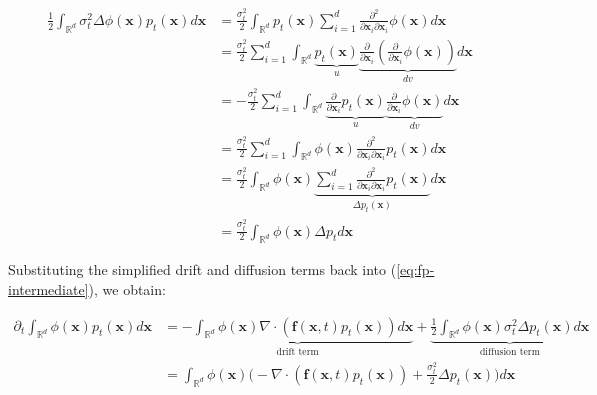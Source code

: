 \documentclass{article}
\begin{document}
\begin{small}
\begin{align}
    \frac{1}{2}\int_{\mathbb{R}^d}\sigma_t^2\Delta \phi(\boldsymbol{x})p_t(\boldsymbol{x})d\boldsymbol{x}&=\frac{\sigma_t^2}{2}\int_{\mathbb{R}^d}p_t(\boldsymbol{x})\sum_{i=1}^d\frac{\partial^2}{\partial\boldsymbol{x}_i \partial\boldsymbol{x}_i} \phi(\boldsymbol{x})d\boldsymbol{x}\nonumber\\
    &=\frac{\sigma_t^2}{2}\sum_{i=1}^d\int_{\mathbb{R}^d}\underbrace{p_t(\boldsymbol{x})}_{u}\underbrace{\frac{\partial}{\partial\boldsymbol{x}_i}\left( \frac{\partial}{\partial\boldsymbol{x}_i}\phi(\boldsymbol{x})\right)}_{dv}d\boldsymbol{x}\tag{1st integration by parts}\\
    &= -\frac{\sigma_t^2}{2}\sum_{i=1}^d\int_{\mathbb{R}^d}\underbrace{\frac{\partial}{\partial\boldsymbol{x}_i} p_t(\boldsymbol{x})}_{u}\underbrace{\frac{\partial}{\partial\boldsymbol{x}_i}\phi(\boldsymbol{x})}_{dv}d\boldsymbol{x}\tag{2nd integration by parts}\\
    &=\frac{\sigma_t^2}{2}\sum_{i=1}^d\int_{\mathbb{R}^d}\phi(\boldsymbol{x})\frac{\partial^2}{\partial\boldsymbol{x}_i\partial \boldsymbol{x}_i}p_t(\boldsymbol{x})d\boldsymbol{x}\nonumber\\
    &=\frac{\sigma_t^2}{2}\int_{\mathbb{R}^d}\phi(\boldsymbol{x})\underbrace{\sum_{i=1}^d\frac{\partial^2}{\partial\boldsymbol{x}_i\partial \boldsymbol{x}_i}p_t(\boldsymbol{x})}_{\Delta p_t(\boldsymbol{x})}d\boldsymbol{x}\nonumber\\
    &=\boxed{\frac{\sigma_t^2}{2}\int_{\mathbb{R}^d}\phi(\boldsymbol{x})\Delta p_td\boldsymbol{x}}\tag{diffusion term}
\end{align}
\end{small}
Substituting the simplified drift and diffusion terms back into (\ref{eq:fp-intermediate}), we obtain:
\begin{small}
\begin{align}
    \partial_t\int_{\mathbb{R}^d}\phi(\boldsymbol{x})p_t(\boldsymbol{x})d\boldsymbol{x}&=\underbrace{-\int_{\mathbb{R}^d}\phi(\boldsymbol{x})\nabla\cdot (\boldsymbol{f}(\boldsymbol{x},t) p_t(\boldsymbol{x}))d\boldsymbol{x}}_{\text{drift term}}+\underbrace{\frac{1}{2}\int_{\mathbb{R}^d}\phi(\boldsymbol{x})\sigma_t^2\Delta p_t(\boldsymbol{x})d\boldsymbol{x}}_{\text{diffusion term}}\nonumber\\
    &=\int_{\mathbb{R}^d}\phi(\boldsymbol{x})\bigg(-\nabla\cdot (\boldsymbol{f}(\boldsymbol{x},t) p_t(\boldsymbol{x}))+\frac{\sigma_t^2}{2}\Delta p_t(\boldsymbol{x})\bigg)d\boldsymbol{x}
\end{align}
\end{small}
\end{document}
